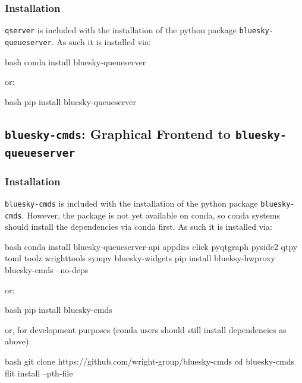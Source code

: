 \subsubsection{Installation}

\texttt{qserver} is included with the installation of the python package \texttt{bluesky-queueserver}.
As such it is installed via:

\begin{codefragment}{bash}
conda install bluesky-queueserver
\end{codefragment}

or:

\begin{codefragment}{bash}
pip install bluesky-queueserver
\end{codefragment}

\subsection{\texttt{bluesky-cmds}: Graphical Frontend to \texttt{bluesky-queueserver}}

\subsubsection{Installation}

\texttt{bluesky-cmds} is included with the installation of the python package \texttt{bluesky-cmds}.
However, the package is not yet available on conda, so conda systems should install the dependencies via conda first.
As such it is installed via:

\begin{codefragment}{bash}
conda install bluesky-queueserver-api appdirs click pyqtgraph pyside2 qtpy toml toolz wrighttools sympy bluesky-widgets
pip install blueksy-hwproxy bluesky-cmds --no-deps
\end{codefragment}

or:

\begin{codefragment}{bash}
pip install bluesky-cmds
\end{codefragment}

or, for development purposes (conda users should still install dependencies as above):

\begin{codefragment}{bash}
git clone https://github.com/wright-group/bluesky-cmds
cd bluesky-cmds
flit install --pth-file
\end{codefragment}

